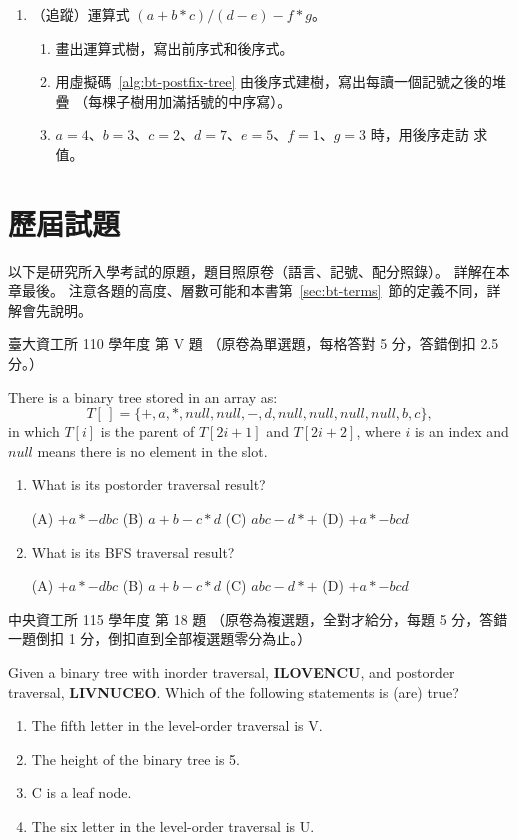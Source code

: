 \begin{enumerate}
\item （追蹤）運算式 $(a + b * c) / (d - e) - f * g$。
\begin{enumerate}
\item 畫出運算式樹，寫出前序式和後序式。
\item 用虛擬碼~\ref{alg:bt-postfix-tree} 由後序式建樹，寫出每讀一個記號之後的堆疊
（每棵子樹用加滿括號的中序寫）。
\item $a = 4$、$b = 3$、$c = 2$、$d = 7$、$e = 5$、$f = 1$、$g = 3$ 時，用後序走訪
求值。
\end{enumerate}

\end{enumerate}

\section{歷屆試題}
\label{sec:bt-pastexam}

以下是研究所入學考試的原題，題目照原卷（語言、記號、配分照錄）。 詳解在本章最後。
注意各題的高度、層數可能和本書第~\ref{sec:bt-terms}~節的定義不同，詳解會先說明。

\begin{pastexam}[label={px:bt-1}]{臺大資工所 110 學年度 第 V 題}
（原卷為單選題，每格答對 5 分，答錯倒扣 2.5 分。）

There is a binary tree stored in an array as:
\[T[\,]=\{+,a,*,null,null,-,d,null,null,null,null,b,c\},\]
in which $T[i]$ is the parent of $T[2i+1]$ and $T[2i+2]$, where $i$ is an index and $null$
means there is no element in the slot.
\begin{enumerate}[label=(\alph*)]
\item What is its postorder traversal result? \underline{}

(A) $+a*-dbc$ \qquad (B) $a+b-c*d$ \qquad (C) $abc-d*+$ \qquad (D) $+a*-bcd$
\item What is its BFS traversal result? \underline{}

(A) $+a*-dbc$ \qquad (B) $a+b-c*d$ \qquad (C) $abc-d*+$ \qquad (D) $+a*-bcd$
\end{enumerate}
\end{pastexam}

\begin{pastexam}[label={px:bt-2}]{中央資工所 115 學年度 第 18 題}
（原卷為複選題，全對才給分，每題 5 分，答錯一題倒扣 1 分，倒扣直到全部複選題零分為止。）

Given a binary tree with inorder traversal, \textbf{ILOVENCU}, and postorder traversal,
\textbf{LIVNUCEO}. Which of the following statements is (are) true?
\begin{enumerate}[label=\Alph*.]
\item The fifth letter in the level-order traversal is V.
\item The height of the binary tree is 5.
\item C is a leaf node.
\item The six letter in the level-order traversal is U.
\end{enumerate}
\end{pastexam}

